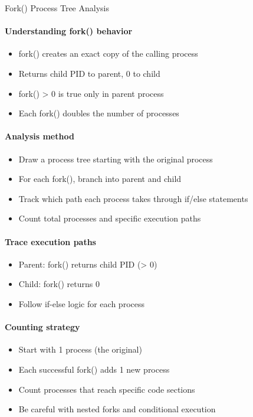 \begin{KR}{Fork() Process Tree Analysis}
    \paragraph{Understanding fork() behavior}
    \begin{itemize}
        \item fork() creates an exact copy of the calling process
        \item Returns child PID to parent, 0 to child
        \item fork() > 0 is true only in parent process
        \item Each fork() doubles the number of processes
    \end{itemize}
    
    \paragraph{Analysis method}
    \begin{itemize}
        \item Draw a process tree starting with the original process
        \item For each fork(), branch into parent and child
        \item Track which path each process takes through if/else statements
        \item Count total processes and specific execution paths
    \end{itemize}

    \paragraph{Trace execution paths}
    \begin{itemize}
        \item Parent: fork() returns child PID (> 0)
        \item Child: fork() returns 0
        \item Follow if-else logic for each process
    \end{itemize}
    
    \paragraph{Counting strategy}
    \begin{itemize}
        \item Start with 1 process (the original)
        \item Each successful fork() adds 1 new process
        \item Count processes that reach specific code sections
        \item Be careful with nested forks and conditional execution
    \end{itemize}


\end{KR}
